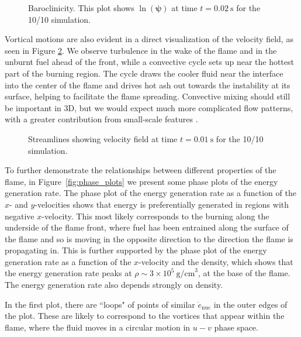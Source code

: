 \documentclass[preprint,times,tighten]{aastex63}
\begin{document}
\begin{figure}[t]
\centering
{}
\caption{\label{fig:baroclinicity} Baroclinicity. This plot shows
$\ln \left(\mathbf{\psi}\right)$ at time $t = 0.02~\mathrm{s}$ for the 10/10 simulation.}
\end{figure}

Vortical motions are also evident in a direct visualization of the velocity field, as seen in
Figure \ref{fig:streamlines}. We observe turbulence in the wake of the flame and in the
unburnt fuel ahead of the front, while a convective cycle sets up near the hottest part of the
burning region. The cycle draws the cooler fluid near the interface into the center of the flame
and drives hot ash out towards the instability at its surface, helping to facilitate the flame
spreading. Convective mixing should still be important in 3D, but we would expect much more
complicated flow patterns, with a greater contribution from small-scale features \citep{xrb3d}.

\begin{figure}[t]
	\centering
	\caption{\label{fig:streamlines} Streamlines showing velocity field at time $t = 0.01~\mathrm{s}$ for the 10/10 simulation.}
\end{figure}

To further demonstrate the relationships between different properties
of the flame, in Figure~\ref{fig:phase_plots} we present some phase
plots of the energy generation rate. The phase plot of the energy
generation rate as a function of the $x$- and $y$-velocities shows
that energy is preferentially generated in regions with negative
$x$-velocity. This most likely corresponds to the burning along the
underside of the flame front, where fuel has been entrained along the
surface of the flame and so is moving in the opposite direction to the
direction the flame is propagating in. This is further supported by
the phase plot of the energy generation rate as a function of the
$x$-velocity and the density, which shows that the energy generation
rate peaks at $\rho \sim 3 \times 10^5~\mathrm{g/cm}^3$, at the base
of the flame.  The energy generation rate also depends strongly on density.

In the first plot, there are ``loops" of
points of similar $\dot{e}_\mathrm{nuc}$ in the outer edges of the plot.
These are likely to correspond to the vortices that appear within the flame,
where the fluid moves in a circular motion in $u-v$ phase space.
\end{document}
